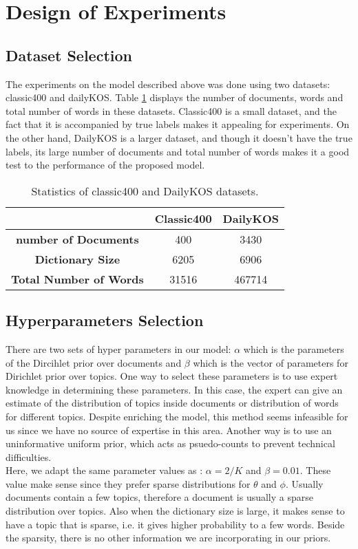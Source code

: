 \documentclass[twoside,12pt]{article}
\begin{document}
\section{Design of Experiments}

\subsection{Dataset Selection}
The experiments on the model described above was done using two datasets: classic400 and dailyKOS. Table \ref{tableDatasetStats} displays the number of documents, words and total number of words in these datasets. Classic400 is a small dataset, and the fact that it is accompanied by true labels makes it appealing for experiments. On the other hand, DailyKOS  is a larger dataset, and though it doesn't have the true labels, its large number of documents and total number of words makes it a good test to the performance of the proposed model. 


\begin{table}
\vspace{-2cm}
\center
\begin{tabular}{|c|c|c|}
\hline
 & \textbf{Classic400} & \textbf{DailyKOS} \\
 \hline
\textbf{ number of Documents} & 400 & 3430 \\
\textbf{ Dictionary Size} & 6205 & 6906 \\
\textbf{ Total Number of Words} & 31516 & 467714\\
 \hline
\end{tabular}
\caption{Statistics of classic400 and DailyKOS datasets.}
\label{tableDatasetStats}
\end{table}


\subsection{Hyperparameters Selection}
There are two sets of hyper parameters in our model: $\alpha$ which is the parameters of the Dircihlet prior over documents and $\beta$ which is the vector of parameters for Dirichlet prior over topics. One way to select these parameters is to use expert knowledge in determining these parameters. In this case, the expert can give an estimate of the distribution of topics inside documents or distribution of words for different topics. Despite enriching the model, this method seems infeasible for us since we have no source of expertise in this area. Another way is to use an uninformative uniform prior, which acts as psuedo-counts to prevent technical difficulties.\\
Here, we adapt the same parameter values as \cite{fastlda}: $\alpha = 2/K$ and $\beta=0.01$. These value make sense since they prefer sparse distributions for $\theta$ and $\phi$. Usually documents contain a few topics, therefore a document is usually a sparse distribution over topics. Also when the dictionary size is large, it makes sense to have a topic that is sparse, i.e. it gives higher probability to a few words. Beside the sparsity, there is no other information we are incorporating in our priors. 
\end{document}
